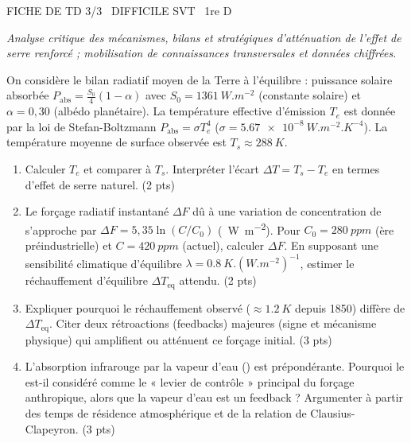 \documentclass[11pt]{article}
\begin{document}
\begin{tcolorbox}[enhanced,colback=popink,colframe=popink,arc=10pt,boxrule=0pt,left=12pt,right=12pt,top=9pt,bottom=9pt]
{\color{white}\popxbold\small FICHE DE TD 3/3 \textbullet\ DIFFICILE \hfill SVT \textbullet\ 1re D\par}
\end{tcolorbox}
\vspace{4pt}
\emph{Analyse critique des mécanismes, bilans et stratégiques d'atténuation de l'effet de serre renforcé ; mobilisation de connaissances transversales et données chiffrées.}

\begin{exercice}
On considère le bilan radiatif moyen de la Terre à l'équilibre : puissance solaire absorbée $P_{\text{abs}} = \frac{S_0}{4}(1-\alpha)$ avec $S_0 = \SI{1361}{W.m^{-2}}$ (constante solaire) et $\alpha = 0,30$ (albédo planétaire). La température effective d'émission $T_e$ est donnée par la loi de Stefan-Boltzmann $P_{\text{abs}} = \sigma T_e^4$ ($\sigma = \SI{5,67e-8}{W.m^{-2}.K^{-4}}$). La température moyenne de surface observée est $T_s \approx \SI{288}{K}$.

\begin{enumerate}
    \item Calculer $T_e$ et comparer à $T_s$. Interpréter l'écart $\Delta T = T_s - T_e$ en termes d'effet de serre naturel. (2 pts)
    \item Le forçage radiatif instantané $\Delta F$ dû à une variation de concentration de  s'approche par $\Delta F = 5,35 \ln(C/C_0)$ (\SI{}{W.m^{-2}}). Pour $C_0 = \SI{280}{ppm}$ (ère préindustrielle) et $C = \SI{420}{ppm}$ (actuel), calculer $\Delta F$. En supposant une sensibilité climatique d'équilibre $\lambda = \SI{0,8}{K.(W.m^{-2})^{-1}}$, estimer le réchauffement d'équilibre $\Delta T_{\text{eq}}$ attendu. (2 pts)
    \item Expliquer pourquoi le réchauffement observé ($\approx \SI{1,2}{K}$ depuis 1850) diffère de $\Delta T_{\text{eq}}$. Citer deux rétroactions (feedbacks) majeures (signe et mécanisme physique) qui amplifient ou atténuent ce forçage initial. (3 pts)
    \item L'absorption infrarouge par la vapeur d'eau () est prépondérante. Pourquoi le  est-il considéré comme le « levier de contrôle » principal du forçage anthropique, alors que la vapeur d'eau est un feedback ? Argumenter à partir des temps de résidence atmosphérique et de la relation de Clausius-Clapeyron. (3 pts)
\end{enumerate}
\end{exercice}
\end{document}
